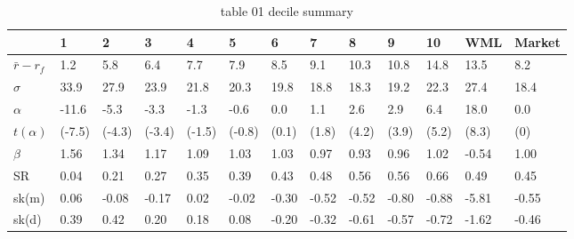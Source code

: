\documentclass{article}
\begin{document}
\begin{table}[htbp]
  \centering
  \caption{table 01 decile summary}
  \label{tab:table_01_decile_summary}
  \begin{tabular}{lllllllllllll}
\toprule
 & 1 & 2 & 3 & 4 & 5 & 6 & 7 & 8 & 9 & 10 & WML & Market \\
\midrule
$\bar{r} - r_f$ & 1.2 & 5.8 & 6.4 & 7.7 & 7.9 & 8.5 & 9.1 & 10.3 & 10.8 & 14.8 & 13.5 & 8.2 \\
$\sigma$ & 33.9 & 27.9 & 23.9 & 21.8 & 20.3 & 19.8 & 18.8 & 18.3 & 19.2 & 22.3 & 27.4 & 18.4 \\
$\alpha$ & -11.6 & -5.3 & -3.3 & -1.3 & -0.6 & 0.0 & 1.1 & 2.6 & 2.9 & 6.4 & 18.0 & 0.0 \\
$t(\alpha)$ & (-7.5) & (-4.3) & (-3.4) & (-1.5) & (-0.8) & (0.1) & (1.8) & (4.2) & (3.9) & (5.2) & (8.3) & (0) \\
$\beta$ & 1.56 & 1.34 & 1.17 & 1.09 & 1.03 & 1.03 & 0.97 & 0.93 & 0.96 & 1.02 & -0.54 & 1.00 \\
SR & 0.04 & 0.21 & 0.27 & 0.35 & 0.39 & 0.43 & 0.48 & 0.56 & 0.56 & 0.66 & 0.49 & 0.45 \\
sk(m) & 0.06 & -0.08 & -0.17 & 0.02 & -0.02 & -0.30 & -0.52 & -0.52 & -0.80 & -0.88 & -5.81 & -0.55 \\
sk(d) & 0.39 & 0.42 & 0.20 & 0.18 & 0.08 & -0.20 & -0.32 & -0.61 & -0.57 & -0.72 & -1.62 & -0.46 \\
\bottomrule
\end{tabular}
\end{table}
\end{document}
